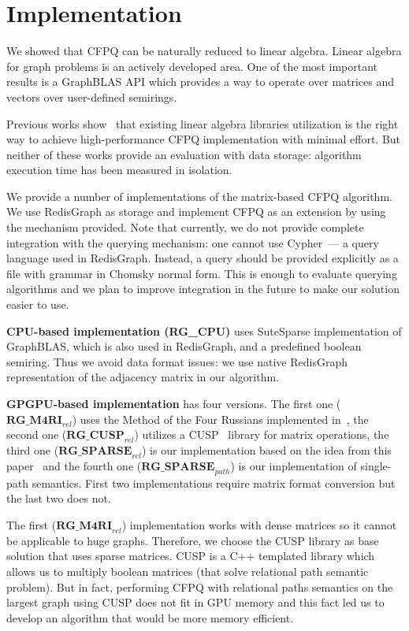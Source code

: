 \section{Implementation}

We showed that CFPQ can be naturally reduced to linear algebra.
Linear algebra for graph problems is an actively developed area.
One of the most important results is a GraphBLAS API which provides a way to operate over matrices and vectors over user-defined semirings.

Previous works show~\cite{Mishin:2019:ECP:3327964.3328503, Azimov:2018:CPQ:3210259.3210264} that existing linear algebra libraries utilization is the right way to achieve high-performance CFPQ implementation with minimal effort.
But neither of these works provide an evaluation with data storage: algorithm execution time has been measured in isolation.

We provide a number of implementations of the matrix-based CFPQ algorithm.
We use RedisGraph as storage and implement CFPQ as an extension by using the mechanism provided.
Note that currently, we do not provide complete integration with the querying mechanism: one cannot use Cypher~--- a query language used in RedisGraph.
Instead, a query should be provided explicitly as a file with grammar in Chomsky normal form.
This is enough to evaluate querying algorithms and we plan to improve integration in the future to make our solution easier to use. 

\textbf{CPU-based implementation (RG\_CPU)} uses SuteSparse implementation of GraphBLAS, which is also used in RedisGraph, and a predefined boolean semiring.
Thus we avoid data format issues: we use native RedisGraph representation of the adjacency matrix in our algorithm.

\textbf{GPGPU-based implementation} has four versions.
The first one ($\textbf{RG\_M4RI}_{rel}$) uses the Method of the Four Russians implemented in~\cite{Mishin:2019:ECP:3327964.3328503}, the second one ($\textbf{RG\_CUSP}_{rel}$) utilizes a CUSP~\cite{Cusp} library for matrix operations, the third one ($\textbf{RG\_SPARSE}_{rel}$) is our implementation based on the idea from this paper~\cite{NsparsePaper} and the fourth one ($\textbf{RG\_SPARSE}_{path}$) is our implementation of single-path semantics.
First two implementations require matrix format conversion but the last two does not.

The first ($\textbf{RG\_M4RI}_{rel}$) implementation works with dense matrices so it cannot be applicable to huge graphs. Therefore, we choose the CUSP library as base solution that uses sparse matrices. CUSP is a C++ templated library which allows us to multiply boolean matrices (that solve relational path semantic problem). But in fact, performing CFPQ with relational paths semantics on the largest graph using CUSP does not fit in GPU memory and this fact led us to develop an algorithm that would be more memory efficient.

